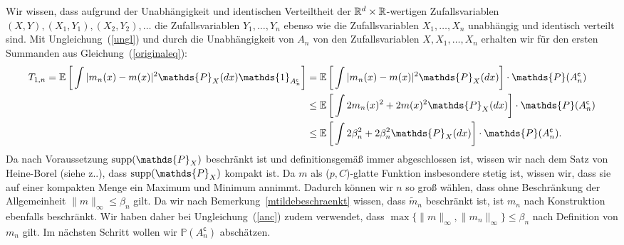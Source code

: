 {Wir wissen, dass aufgrund der Unabhängigkeit und identischen Verteiltheit der $\mathbb{R}^d \times \mathbb{R}$-wertigen Zufallsvariablen  $(X, Y), (X_1, Y_1), (X_2, Y_2), \dots$ die Zufallsvariablen $Y_1,\dots,Y_n$ ebenso wie die Zufallsvariablen $X_1,\dots,X_n$ unabhängig und identisch verteilt sind. 
Mit Ungleichung~(\ref{ungl}) und durch die Unabhängigkeit von $A_n$ von den Zufallsvariablen $X, X_1, \dots, X_n$ erhalten wir für den ersten Summanden aus Gleichung~(\ref{originaleq}):
\begin{equation}
\label{anc}
\begin{split}
 T_{1,n} = \E \bigg[\int |m_n(x) - m(x)|^2 \mathds{P}_X(dx) \mathds{1}_{A_n^{\mathsf{c}}}\bigg] & =  \E \bigg[\int |m_n(x) - m(x)|^2 \mathds{P}_X(dx) \bigg] \cdot \mathds{P}(A_n^{\mathsf{c}}) \\
 & \leq \E \bigg[\int 2m_n(x)^2 + 2m(x)^2 \mathds{P}_X(dx)\bigg] \cdot \mathds{P}(A_n^{\mathsf{c}})\\
 & \leq \E \bigg[\int  2\beta_n^2 + 2\beta_n^2 \mathds{P}_X(dx)\bigg] \cdot \mathds{P}(A_n^{\mathsf{c}}).
\end{split}
\end{equation}
Da nach Voraussetzung $\supp(\mathds{P}_X)$ beschränkt ist und definitionsgemäß immer abgeschlossen ist, wissen wir nach dem Satz von Heine-Borel (siehe z.\@B.\@ \cite[Satz 5]{forster2016}), dass $\supp(\mathds{P}_X)$ kompakt ist. Da $m$ als ($p,C$)-glatte Funktion insbesondere stetig ist, wissen wir, dass sie auf einer kompakten Menge ein Maximum und Minimum annimmt. Dadurch können wir $n$ so groß wählen, dass ohne Beschränkung der Allgemeinheit $\|m\|_{\infty} \leq \beta_n$ gilt.
Da wir nach Bemerkung~\ref{mtildebeschraenkt} wissen, dass $\tilde{m}_n$ beschränkt ist, ist $m_n$ nach Konstruktion ebenfalls beschränkt. Wir haben daher bei Ungleichung~(\ref{anc}) zudem verwendet, dass $\max\{\|m\|_{\infty}, \|m_n\|_{\infty}\} \leq \beta_n$ nach Definition von $m_n$ gilt. 
Im nächsten Schritt wollen wir $\mathds{P}(A_n^{\mathsf{c}})$ abschätzen.

}
